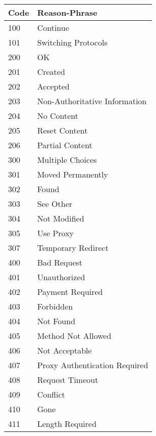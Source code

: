    \begin{longtable}{|l|l|} 
      \hline
      \textbf{Code} & \textbf{Reason-Phrase}
   \\ \hline 100  & Continue                      
   \\ \hline 101  & Switching Protocols           
   \\ \hline 200  & OK                            
   \\ \hline 201  & Created                       
   \\ \hline 202  & Accepted                      
   \\ \hline 203  & Non-Authoritative Information 
   \\ \hline 204  & No Content                    
   \\ \hline 205  & Reset Content                 
   \\ \hline 206  & Partial Content               
   \\ \hline 300  & Multiple Choices              
   \\ \hline 301  & Moved Permanently             
   \\ \hline 302  & Found                         
   \\ \hline 303  & See Other                     
   \\ \hline 304  & Not Modified                  
   \\ \hline 305  & Use Proxy                     
   \\ \hline 307  & Temporary Redirect            
   \\ \hline 400  & Bad Request                   
   \\ \hline 401  & Unauthorized                  
   \\ \hline 402  & Payment Required              
   \\ \hline 403  & Forbidden                     
   \\ \hline 404  & Not Found                     
   \\ \hline 405  & Method Not Allowed            
   \\ \hline 406  & Not Acceptable                
   \\ \hline 407  & Proxy Authentication Required 
   \\ \hline 408  & Request Timeout               
   \\ \hline 409  & Conflict                      
   \\ \hline 410  & Gone                          
   \\ \hline 411  & Length Required               

\end{longtable}
